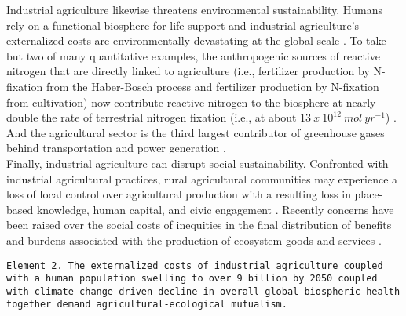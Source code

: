 \documentclass[twoside]{article}	%
\begin{document}
Industrial agriculture likewise threatens environmental sustainability. Humans rely on a functional biosphere for life support and industrial agriculture's externalized costs are environmentally devastating at the global scale \citep{tilman_agricultural_2002, wolfe_crop_2000, ceballos_accelerated_2015}. To take but two of many quantitative examples, the anthropogenic sources of reactive nitrogen that are directly linked to agriculture (i.e., fertilizer production by N-fixation from the Haber-Bosch process and fertilizer production by N-fixation from cultivation) now contribute reactive nitrogen to the biosphere at nearly double the rate of terrestrial nitrogen fixation (i.e., at about $13 \ x \ 10^{12} \ mol \ yr^{-1}$) \citep{canfield_evolution_2010}. And the agricultural sector is the third largest contributor of greenhouse gases behind transportation and power generation \citep{gliessman_agroecology:_2015}. \\

Finally, industrial agriculture can disrupt social sustainability. Confronted with industrial agricultural practices, rural agricultural communities may experience a loss of local control over agricultural production with a resulting loss in place-based knowledge, human capital, and civic engagement \citep{beus_conventional_1990, oecd_well-being_2001}. Recently concerns have been raised over the social costs of inequities in the final distribution of benefits and burdens associated with the production of ecosystem goods and services \citep{berbes-blazquez_towards_2016}.\\

\begin{sloppypar}
\texttt{Element 2. The externalized costs of industrial agriculture coupled with a human population swelling to over 9 billion by 2050 coupled with climate change driven decline in overall global biospheric health together demand agricultural-ecological mutualism.} \\
\end{sloppypar}
\end{document}
